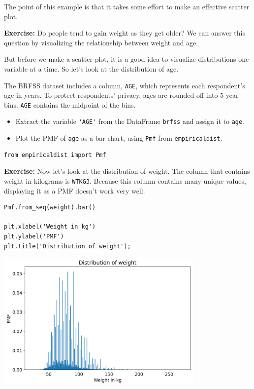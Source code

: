 The point of this example is that it takes some effort to make an
effective scatter plot.

\textbf{Exercise:} Do people tend to gain weight as they get older? We
can answer this question by visualizing the relationship between weight
and age.

But before we make a scatter plot, it is a good idea to visualize
distributions one variable at a time. So let's look at the distribution
of age.

The BRFSS dataset includes a column, \passthrough{\lstinline!AGE!},
which represents each respondent's age in years. To protect respondents'
privacy, ages are rounded off into 5-year bins.
\passthrough{\lstinline!AGE!} contains the midpoint of the bins.

\begin{itemize}
\item
  Extract the variable \passthrough{\lstinline!'AGE'!} from the
  DataFrame \passthrough{\lstinline!brfss!} and assign it to
  \passthrough{\lstinline!age!}.
\item
  Plot the PMF of \passthrough{\lstinline!age!} as a bar chart, using
  \passthrough{\lstinline!Pmf!} from
  \passthrough{\lstinline!empiricaldist!}.
\end{itemize}

\begin{lstlisting}[]
from empiricaldist import Pmf
\end{lstlisting}

\textbf{Exercise:} Now let's look at the distribution of weight. The
column that contains weight in kilograms is
\passthrough{\lstinline!WTKG3!}. Because this column contains many
unique values, displaying it as a PMF doesn't work very well.

\begin{lstlisting}[]
Pmf.from_seq(weight).bar()

plt.xlabel('Weight in kg')
plt.ylabel('PMF')
plt.title('Distribution of weight');
\end{lstlisting}

\begin{center}
\includegraphics[width=4in]{chapters/09_relationships_files/09_relationships_33_0.png}
\end{center}


